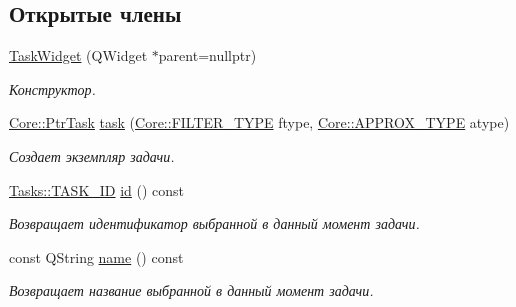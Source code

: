 \subsection*{Открытые члены}
\begin{DoxyCompactItemize}
\item 
\hypertarget{class_task_widget_a31d14904360a3ecc57057aea4b606001}{}\label{class_task_widget_a31d14904360a3ecc57057aea4b606001} 
\hyperlink{class_task_widget_a31d14904360a3ecc57057aea4b606001}{Task\+Widget} (Q\+Widget $\ast$parent=nullptr)
\begin{DoxyCompactList}\small\item\em Конструктор. \end{DoxyCompactList}\item 
\hyperlink{namespace_core_abfda8f69fcacfcea2696549b548ed737}{Core\+::\+Ptr\+Task} \hyperlink{class_task_widget_a03ef83e365334749bac31e04d205e3df}{task} (\hyperlink{namespace_core_af88278693f3c866f217da796f4bb9af7}{Core\+::\+F\+I\+L\+T\+E\+R\+\_\+\+T\+Y\+PE} ftype, \hyperlink{namespace_core_acd67f53ff1d9b21fabb1da4474a8f7d9}{Core\+::\+A\+P\+P\+R\+O\+X\+\_\+\+T\+Y\+PE} atype)
\begin{DoxyCompactList}\small\item\em Создает экземпляр задачи. \end{DoxyCompactList}\item 
\hypertarget{class_task_widget_a9105eac610d20165304b42105d16267f}{}\label{class_task_widget_a9105eac610d20165304b42105d16267f} 
\hyperlink{namespace_tasks_acf6b541f8ce51b63eb9fcb8748317707}{Tasks\+::\+T\+A\+S\+K\+\_\+\+ID} \hyperlink{class_task_widget_a9105eac610d20165304b42105d16267f}{id} () const
\begin{DoxyCompactList}\small\item\em Возвращает идентификатор выбранной в данный момент задачи. \end{DoxyCompactList}\item 
\hypertarget{class_task_widget_a809b88d7b0a7ecdfc7ae64df1f7d2b2f}{}\label{class_task_widget_a809b88d7b0a7ecdfc7ae64df1f7d2b2f} 
const Q\+String \hyperlink{class_task_widget_a809b88d7b0a7ecdfc7ae64df1f7d2b2f}{name} () const
\begin{DoxyCompactList}\small\item\em Возвращает название выбранной в данный момент задачи. \end{DoxyCompactList}\end{DoxyCompactItemize}
